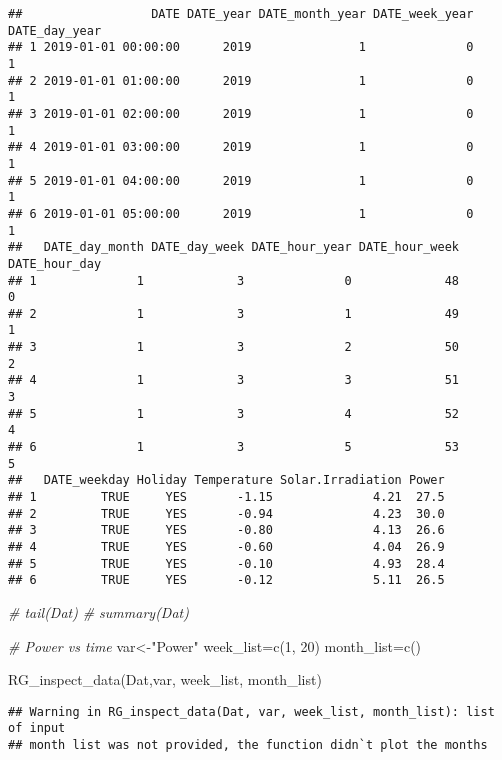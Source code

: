 \documentclass[
]{article}
\newenvironment{Shaded}{\begin{snugshade}}{\end{snugshade}}
\newcommand{\CommentTok}[1]{\textcolor[rgb]{0.56,0.35,0.01}{\textit{#1}}}
\newcommand{\DecValTok}[1]{\textcolor[rgb]{0.00,0.00,0.81}{#1}}
\newcommand{\FunctionTok}[1]{\textcolor[rgb]{0.00,0.00,0.00}{#1}}
\newcommand{\NormalTok}[1]{#1}
\newcommand{\OtherTok}[1]{\textcolor[rgb]{0.56,0.35,0.01}{#1}}
\newcommand{\StringTok}[1]{\textcolor[rgb]{0.31,0.60,0.02}{#1}}
\begin{document}
\begin{verbatim}
##                  DATE DATE_year DATE_month_year DATE_week_year DATE_day_year
## 1 2019-01-01 00:00:00      2019               1              0             1
## 2 2019-01-01 01:00:00      2019               1              0             1
## 3 2019-01-01 02:00:00      2019               1              0             1
## 4 2019-01-01 03:00:00      2019               1              0             1
## 5 2019-01-01 04:00:00      2019               1              0             1
## 6 2019-01-01 05:00:00      2019               1              0             1
##   DATE_day_month DATE_day_week DATE_hour_year DATE_hour_week DATE_hour_day
## 1              1             3              0             48             0
## 2              1             3              1             49             1
## 3              1             3              2             50             2
## 4              1             3              3             51             3
## 5              1             3              4             52             4
## 6              1             3              5             53             5
##   DATE_weekday Holiday Temperature Solar.Irradiation Power
## 1         TRUE     YES       -1.15              4.21  27.5
## 2         TRUE     YES       -0.94              4.23  30.0
## 3         TRUE     YES       -0.80              4.13  26.6
## 4         TRUE     YES       -0.60              4.04  26.9
## 5         TRUE     YES       -0.10              4.93  28.4
## 6         TRUE     YES       -0.12              5.11  26.5
\end{verbatim}

\begin{Shaded}
\begin{Highlighting}[]
  \CommentTok{\# tail(Dat)}
  \CommentTok{\# summary(Dat)}
  
  \CommentTok{\# Power vs time}
\NormalTok{  var}\OtherTok{\textless{}{-}}\StringTok{"Power"}
\NormalTok{  week\_list}\OtherTok{=}\FunctionTok{c}\NormalTok{(}\DecValTok{1}\NormalTok{, }\DecValTok{20}\NormalTok{)}
\NormalTok{  month\_list}\OtherTok{=}\FunctionTok{c}\NormalTok{()}
  
  \FunctionTok{RG\_inspect\_data}\NormalTok{(Dat,var, week\_list, month\_list)}
\end{Highlighting}
\end{Shaded}

\begin{verbatim}
## Warning in RG_inspect_data(Dat, var, week_list, month_list): list of input
## month list was not provided, the function didn`t plot the months
\end{verbatim}
\end{document}
